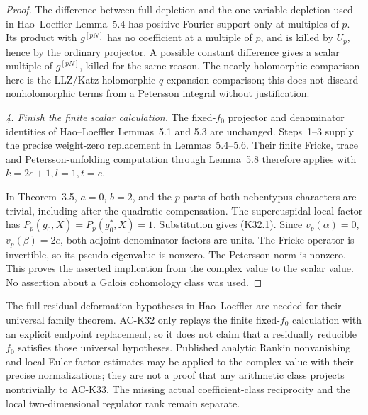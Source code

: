 \begin{proof}
The difference between full depletion and the one-variable
depletion used in Hao--Loeffler Lemma~5.4 has positive
Fourier support only at multiples of \(p\).
Its product with \(g^{[pN]}\) has no coefficient at a
multiple of \(p\), and is killed by \(U_p\), hence by
the ordinary projector.  A possible constant difference
gives a scalar multiple of \(g^{[pN]}\), killed for the
same reason.  The nearly-holomorphic comparison here is
the LLZ/Katz holomorphic-\(q\)-expansion comparison; this
does not discard nonholomorphic terms from a Petersson
integral without justification.

\emph{4. Finish the finite scalar calculation.}
The fixed-\(f_0\) projector and denominator identities
of Hao--Loeffler Lemmas~5.1 and 5.3 are unchanged.
Steps~1--3 supply the precise weight-zero replacement
in Lemmas~5.4--5.6.  Their finite Fricke, trace and
Petersson-unfolding computation through Lemma~5.8
therefore applies with \(k=2e+1,l=1,t=e\).

In Theorem~3.5, \(a=0\), \(b=2\), and the \(p\)-parts
of both nebentypus characters are trivial, including
after the quadratic compensation.  The supercuspidal
local factor has \(P_p(g_0,X)=P_p(g_0^*,X)=1\).
Substitution gives (K32.1).
Since \(v_p(\alpha)=0\), \(v_p(\beta)=2e\),
both adjoint denominator factors are units.
The Fricke operator is invertible, so its
pseudo-eigenvalue is nonzero.  The Petersson norm is
nonzero.  This proves the asserted implication from
the complex value to the scalar value.  No assertion
about a Galois cohomology class was used.
\end{proof}

\begin{remark}
The full residual-deformation hypotheses in Hao--Loeffler
are needed for their universal family theorem.
AC-K32 only replays the finite fixed-\(f_0\) calculation
with an explicit endpoint replacement, so it does not
claim that a residually reducible \(f_0\) satisfies those
universal hypotheses.  Published analytic Rankin
nonvanishing and local Euler-factor estimates may be
applied to the complex value with their precise
normalizations; they are not a proof that any arithmetic
class projects nontrivially to AC-K33.
The missing actual coefficient-class reciprocity and
the local two-dimensional regulator rank remain separate.
\end{remark}

